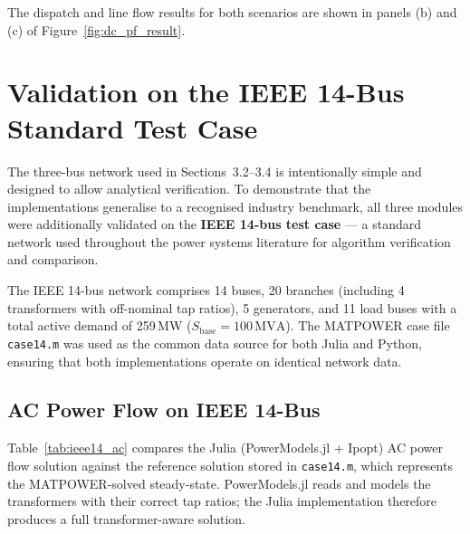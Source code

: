 The dispatch and line flow results for both scenarios are shown in panels (b) and (c) of Figure~\ref{fig:dc_pf_result}.

\section{Validation on the IEEE 14-Bus Standard Test Case}
\label{sec:ieee14}

The three-bus network used in Sections~3.2--3.4 is intentionally simple and designed to allow analytical verification. To demonstrate that the implementations generalise to a recognised industry benchmark, all three modules were additionally validated on the \textbf{IEEE 14-bus test case} \cite{zimmerman2011matpower} --- a standard network used throughout the power systems literature for algorithm verification and comparison.

The IEEE 14-bus network comprises 14 buses, 20 branches (including 4 transformers with off-nominal tap ratios), 5 generators, and 11 load buses with a total active demand of 259\,MW ($S_\text{base} = 100\,\text{MVA}$). The MATPOWER case file \texttt{case14.m} was used as the common data source for both Julia and Python, ensuring that both implementations operate on identical network data.

\subsection{AC Power Flow on IEEE 14-Bus}

Table~\ref{tab:ieee14_ac} compares the Julia (PowerModels.jl + Ipopt) AC power flow solution against the reference solution stored in \texttt{case14.m}, which represents the MATPOWER-solved steady-state. PowerModels.jl reads and models the transformers with their correct tap ratios; the Julia implementation therefore produces a full transformer-aware solution.

